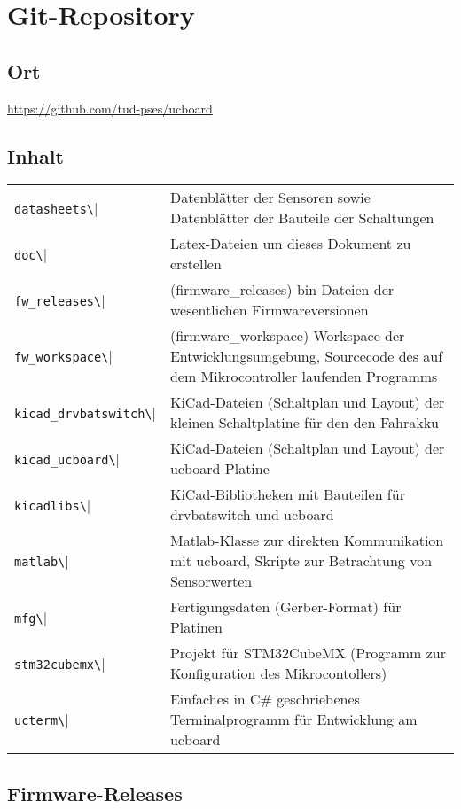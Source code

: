

\chapter{Git-Repository}


\section{Ort}

\href{https://github.com/tud-pses/ucboard}{\color[rgb]{0,0,1}https://github.com/tud-pses/ucboard}

\section{Inhalt}

\begin{tabular}{lp{12cm}}
	\verb|datasheets\| & Datenblätter der Sensoren sowie Datenblätter der Bauteile der Schaltungen \\
	\verb|doc\| & Latex-Dateien um dieses Dokument zu erstellen \\
	\verb|fw_releases\| & (firmware\_releases) bin-Dateien der wesentlichen Firmwareversionen \\
	\verb|fw_workspace\| & (firmware\_workspace) Workspace der Entwicklungsumgebung, Sourcecode des auf dem Mikrocontroller laufenden Programms \\
	\verb|kicad_drvbatswitch\| & KiCad-Dateien (Schaltplan und Layout) der kleinen Schaltplatine für den den Fahrakku \\
	\verb|kicad_ucboard\| & KiCad-Dateien (Schaltplan und Layout) der ucboard-Platine \\
	\verb|kicadlibs\| & KiCad-Bibliotheken mit Bauteilen für drvbatswitch und ucboard \\
	\verb|matlab\| & Matlab-Klasse zur direkten Kommunikation mit ucboard, Skripte zur Betrachtung von Sensorwerten\\
	\verb|mfg\| & Fertigungsdaten (Gerber-Format) für Platinen \\
	\verb|stm32cubemx\| & Projekt für STM32CubeMX (Programm zur Konfiguration des Mikrocontollers) \\
	\verb|ucterm\| & Einfaches in C\# geschriebenes Terminalprogramm für Entwicklung am ucboard
\end{tabular}


\section{Firmware-Releases}

